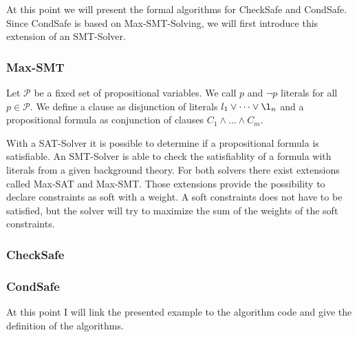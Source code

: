 \documentclass[12pt]{scrartcl}
\begin{document}
At this point we will present the formal algorithms for CheckSafe and CondSafe.
Since CondSafe is based on Max-SMT-Solving, we will first introduce this extension of an SMT-Solver.

\subsubsection{Max-SMT}

Let $\mathcal{P}$ be a fixed set of propositional variables.
We call $p$ and $\neg p$ literals for all $p \in \mathcal{P}$.
We define a clause as disjunction of literals $l_1 \vee \dots \vee \l_n$ and a propositional formula as conjunction of clauses $C_1 \wedge \dots \wedge C_m$.

With a SAT-Solver it is possible to determine if a propositional formula is satisfiable.
An SMT-Solver is able to check the satisfiablity of a formula with literals from a given background theory.
For both solvers there exist extensions called Max-SAT and Max-SMT.
Those extensions provide the possibility to declare constraints as soft with a weight.
A soft constraints does not have to be satisfied, but the solver will try to maximize the sum of the weights of the soft constraints.

\subsubsection{CheckSafe}

\subsubsection{CondSafe}

At this point I will link the presented example to the algorithm code and give the definition of the algorithms.
\end{document}
